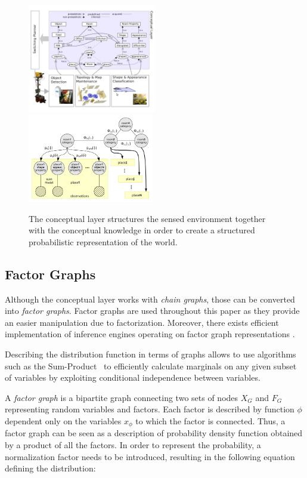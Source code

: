 \documentclass[runningheads,a4paper]{llncs}
\begin{document}
\begin{figure}[h]
\centering

\includegraphics[width=0.50\textwidth]{figures/conceptual-layer.jpg}
\includegraphics[width=0.49\textwidth]{figures/chain-graph.png}
\caption{The conceptual layer structures the sensed environment together with the conceptual knowledge
         in order to create a structured probabilistic representation of the world.}
\end{figure}

\subsection{Factor Graphs}
Although the conceptual layer works with \emph{chain graphs}, those can be converted
into \emph{factor graphs}. Factor graphs are used throughout this paper as they provide an
easier manipulation due to factorization.
Moreover, there exists efficient implementation of inference engines operating on factor graph
representations \cite{Mooij_libDAI_10}.

Describing the distribution function in terms of graphs allows to use algorithms
such as the Sum-Product~\citep{kschischang2001factor} to efficiently calculate
marginals on any given subset of variables by exploiting conditional
independence between variables.

A \emph{factor graph} is a bipartite graph connecting two sets of nodes $X_G$ and $F_G$
representing random variables and factors.
Each factor is described by function $\phi$ dependent only on the variables $x_\phi$
to which the factor is connected.
Thus, a factor graph can be seen as a description of probability density function obtained
by a product of all the factors. In order to represent the probability,
a normalization factor needs to be introduced, resulting in the following equation
defining the distribution:
\end{document}
